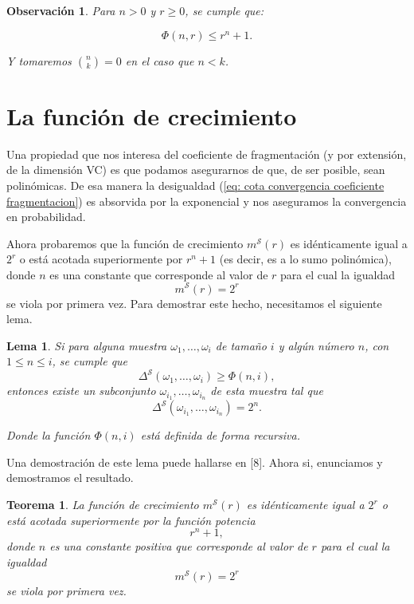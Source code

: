 \documentclass{report}
\newtheorem{thm}{Teorema}[section]
\newtheorem{lem}{Lema}[section]
\newtheorem{obs}{Observación}[section]
\begin{document}
\begin{obs}   
Para \( n > 0 \) y \( r \geq 0 \), se cumple que:

\[
\Phi(n, r) \leq r^n + 1.
\]

Y tomaremos \( \binom{n}{k} = 0 \) en el caso que \( n < k \).\newline
\end{obs}

\section{La función de crecimiento}

Una propiedad que nos interesa del coeficiente de fragmentación (y por extensión, de la dimensión VC) es que podamos asegurarnos
de que, de ser posible, sean polinómicas. De esa manera la desigualdad (\ref{eq: cota convergencia coeficiente fragmentacion})
es absorvida por la exponencial y nos aseguramos la convergencia en probabilidad. \newline

Ahora probaremos que la función de crecimiento $m^{\mathcal{S}}(r)$ 
es idénticamente igual a \( 2^r \) o está acotada superiormente por \( r^n + 1 \) (es decir, es a lo sumo polinómica),  
donde \( n \) es una constante que corresponde al valor de \( r \) para el cual la igualdad  
\[
m^{\mathcal{S}}(r) = 2^r
\]
se viola por primera vez. Para demostrar este hecho, necesitamos el siguiente lema.\newline

\begin{lem}\label{Lema 1}
Si para alguna muestra  \( \omega_1, \ldots, \omega_i \) de tamaño $i$ y algún número \( n \), con \( 1 \leq n \leq i \),  
se cumple que  
\[
\Delta^{\mathcal{S}}(\omega_1, \ldots, \omega_i) \geq \Phi(n, i),
\]  
entonces existe un subconjunto \( \omega_{i_1}, \dots, \omega_{i_n} \) de esta muestra tal que  
\[
\Delta^{\mathcal{S}}(\omega_{i_1}, \dots,\omega_{i_n}) = 2^n.
\]  

Donde la función \( \Phi(n, i) \) está definida de forma recursiva.  \newline
\end{lem}

Una demostración de este lema puede hallarse en [8].
Ahora si, enunciamos y demostramos el resultado.\newline

\begin{thm} \label{teo: cota polinomica de la función de crecimiento}
    La función de crecimiento \( m^{\mathcal{S}}(r) \) es idénticamente igual a \( 2^r \) o está acotada superiormente por la función potencia  
    \[
    r^n + 1,
    \]
    donde \( n \) es una constante positiva que corresponde al valor de \( r \) para el cual la igualdad  
    \[
    m^{\mathcal{S}}(r) = 2^r
    \]
    se viola por primera vez.    
\end{thm}
\end{document}
